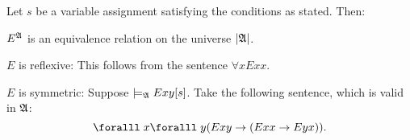 \begin{Answer}
  Let $s$ be a variable assignment satisfying the conditions as stated.
  Then:
  \step
  \begin{enumalph}
    \item $E^{\mathfrak{A}}$ is an equivalence relation on the universe $\lvert\mathfrak{A}\rvert$.
      \begin{enumroman}
        \item $E$ is reflexive: This follows from the sentence $\forall x Exx$.
        \item $E$ is symmetric:
          Suppose $\models_{\mathfrak{A}} Exy [s]$.
          Take the following sentence, which is valid in $\mathfrak{A}$:
          \[ \forall x \forall y (Exy \lto (Exx \lto Eyx)). \]



\end{enumroman}
\end{enumalph}
\end{Answer}
